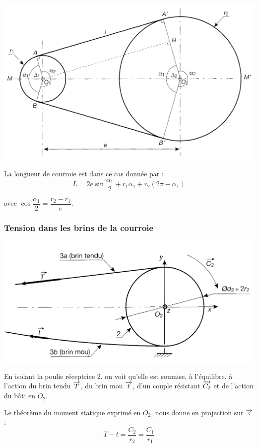 \documentclass[11pt,oneside]{article}
\begin{document}
\begin{minipage}[c]{.55\linewidth}
\begin{center}
\includegraphics[width=.9\textwidth]{png/fig_43}
\end{center}
\end{minipage} \hfill
\begin{minipage}[c]{.4\linewidth}
La longueur de courroie est dans ce cas donnée par : 
$$
L = 2e\sin\dfrac{\alpha_1}{2}+r_1 \alpha_1 + r_2 \left( 2\pi - \alpha_1\right)
$$
  
avec $\cos \dfrac{\alpha_1}{2} = \dfrac{r_2-r_1}{e}$.


\end{minipage} 


\subsubsection{Tension dans les brins de la courroie}

\begin{minipage}[c]{.55\linewidth}
\begin{center}
\includegraphics[width=.9\textwidth]{png/fig_44}
\end{center}
\end{minipage} \hfill
\begin{minipage}[c]{.4\linewidth}
En isolant la poulie réceptrice 2, on voit qu’elle est soumise, à l’équilibre, à l’action du brin tendu $\overrightarrow{T}$, du brin mou $\overrightarrow{t}$, d’un couple résistant $\overrightarrow{C_2}$ et de l’action du bâti en $O_2$.

Le théorème du moment statique exprimé en $O_2$, nous donne en projection sur $\overrightarrow{z}$:
$$
T - t = \dfrac{C_2}{r_2}= \dfrac{C_1}{r_1}
$$
\end{minipage} 
\end{document}
